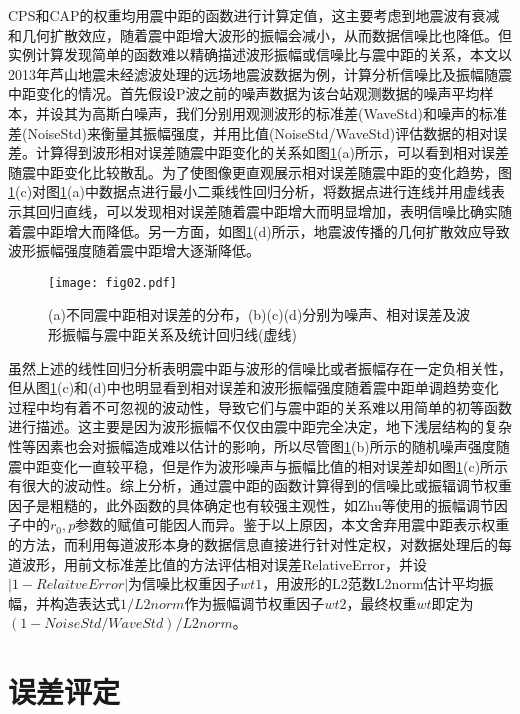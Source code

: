 CPS和CAP的权重均用震中距的函数进行计算定值，这主要考虑到地震波有衰减和几何扩散效应，随着震中距增大波形的振幅会减小，从而数据信噪比也降低。但实例计算发现简单的函数难以精确描述波形振幅或信噪比与震中距的关系，本文以2013年芦山地震未经滤波处理的远场地震波数据为例，计算分析信噪比及振幅随震中距变化的情况。首先假设P波之前的噪声数据为该台站观测数据的噪声平均样本，并设其为高斯白噪声，我们分别用观测波形的标准差(WaveStd)和噪声的标准差(NoiseStd)来衡量其振幅强度，并用比值(NoiseStd/WaveStd)评估数据的相对误差。计算得到波形相对误差随震中距变化的关系如图\ref{fig02}(a)所示，可以看到相对误差随震中距变化比较散乱。为了使图像更直观展示相对误差随震中距的变化趋势，图\ref{fig02}(c)对图\ref{fig02}(a)中数据点进行最小二乘线性回归分析，将数据点进行连线并用虚线表示其回归直线，可以发现相对误差随着震中距增大而明显增加，表明信噪比确实随着震中距增大而降低。另一方面，如图\ref{fig02}(d)所示，地震波传播的几何扩散效应导致波形振幅强度随着震中距增大逐渐降低。
\begin{figure}
\centering
  \texttt{[image: fig02.pdf]} 
  \caption{(a)不同震中距相对误差的分布，(b)(c)(d)分别为噪声、相对误差及波形振幅与震中距关系及统计回归线(虚线)}
  \label{fig02}
\end{figure}

虽然上述的线性回归分析表明震中距与波形的信噪比或者振幅存在一定负相关性，但从图\ref{fig02}(c)和(d)中也明显看到相对误差和波形振幅强度随着震中距单调趋势变化过程中均有着不可忽视的波动性，导致它们与震中距的关系难以用简单的初等函数进行描述。这主要是因为波形振幅不仅仅由震中距完全决定，地下浅层结构的复杂性等因素也会对振幅造成难以估计的影响，所以尽管图\ref{fig02}(b)所示的随机噪声强度随震中距变化一直较平稳，但是作为波形噪声与振幅比值的相对误差却如图\ref{fig02}(c)所示有很大的波动性。综上分析，通过震中距的函数计算得到的信噪比或振辐调节权重因子是粗糙的，此外函数的具体确定也有较强主观性，如Zhu等使用的振幅调节因子中的$r_0,p$参数的赋值可能因人而异。鉴于以上原因，本文舍弃用震中距表示权重的方法，而利用每道波形本身的数据信息直接进行针对性定权，对数据处理后的每道波形，用前文标准差比值的方法评估相对误差RelativeError，并设$|1-RelaitveError|$为信噪比权重因子$wt1$，用波形的L2范数L2norm估计平均振幅，并构造表达式$1/L2norm$作为振幅调节权重因子$wt2$，最终权重$wt$即定为$(1-NoiseStd/WaveStd)/L2norm$。

\section{误差评定}
\label{chap1:sample:table} 

